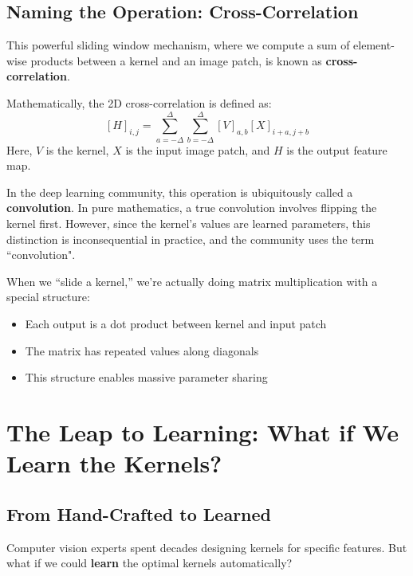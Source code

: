 \documentclass{article}
\begin{document}
\subsection{Naming the Operation: Cross-Correlation}
This powerful sliding window mechanism, where we compute a sum of element-wise products between a kernel and an image patch, is known as \textbf{cross-correlation}.

Mathematically, the 2D cross-correlation is defined as:
$$[H]_{i,j}=\sum_{a=-\Delta}^{\Delta}\sum_{b=-\Delta}^{\Delta}[V]_{a,b}[X]_{i+a,j+b}$$
Here, $V$ is the kernel, $X$ is the input image patch, and $H$ is the output feature map.

In the deep learning community, this operation is ubiquitously called a \textbf{convolution}. In pure mathematics, a true convolution involves flipping the kernel first. However, since the kernel's values are learned parameters, this distinction is inconsequential in practice, and the community uses the term ``convolution".


\begin{tcolorbox}[colback=blue!5!white, colframe=blue!50!black, title=Matrix View (Preview)]
When we ``slide a kernel,'' we're actually doing matrix multiplication with a special structure:
\begin{itemize}
    \item Each output is a dot product between kernel and input patch
    \item The matrix has repeated values along diagonals
    \item This structure enables massive parameter sharing
\end{itemize}
\end{tcolorbox}







\newpage
\section{The Leap to Learning: What if We Learn the Kernels?}

\subsection{From Hand-Crafted to Learned}

Computer vision experts spent decades designing kernels for specific features. But what if we could \textbf{learn} the optimal kernels automatically?
\end{document}
